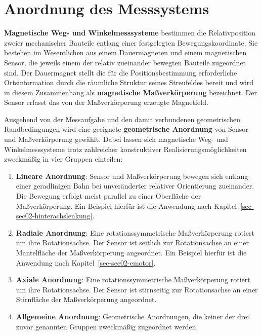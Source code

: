 \documentclass[
  ngerman,
  a4paper,
  twoside]{scrbook}
\providecommand{\tightlist}{%
  \setlength{\itemsep}{0pt}\setlength{\parskip}{0pt}}
\begin{document}
\section{Anordnung des
Messsystems}\label{sec-03-anordnung_des_messsystems}

\textbf{Magnetische Weg- und Winkelmesssysteme} bestimmen die
Relativposition zweier mechanischer Bauteile entlang einer festgelegten
Bewegungskoordinate. Sie bestehen im Wesentlichen aus einem
Dauermagneten und einem magnetischen Sensor, die jeweils einem der
relativ zueinander bewegten Bauteile zugeordnet sind. Der Dauermagnet
stellt die für die Positionsbestimmung erforderliche Ortsinformation
durch die räumliche Struktur seines Streufeldes bereit und wird in
diesem Zusammenhang als \textbf{magnetische Maßverkörperung} bezeichnet.
Der Sensor erfasst das von der Maßverkörperung erzeugte Magnetfeld.

Ausgehend von der Messaufgabe und den damit verbundenen geometrischen
Randbedingungen wird eine geeignete \textbf{geometrische Anordnung} von
Sensor und Maßverkörperung gewählt. Dabei lassen sich magnetische Weg-
und Winkelmesssysteme trotz zahlreicher konstruktiver
Realisierungsmöglichkeiten zweckmäßig in vier Gruppen einteilen:

\begin{enumerate}
\def\labelenumi{\arabic{enumi}.}
\tightlist
\item
  \textbf{Lineare Anordnung}: Sensor und Maßverkörperung bewegen sich
  entlang einer geradlinigen Bahn bei unveränderter relativer
  Orientierung zueinander. Die Bewegung erfolgt meist parallel zu einer
  Oberfläche der Maßverkörperung. Ein Beispiel hierfür ist die Anwendung
  nach Kapitel~\ref{sec-sec02-hinterachslenkung}.
\item
  \textbf{Radiale Anordnung}: Eine rotationssymmetrische Maßverkörperung
  rotiert um ihre Rotationsachse. Der Sensor ist seitlich zur
  Rotationsachse an einer Mantelfläche der Maßverkörperung angeordnet.
  Ein Beispiel hierfür ist die Anwendung nach
  Kapitel~\ref{sec-sec02-emotor}.
\item
  \textbf{Axiale Anordnung}: Eine rotationssymmetrische Maßverkörperung
  rotiert um ihre Rotationsachse. Der Sensor ist stirnseitig zur
  Rotationsachse an einer Stirnfläche der Maßverkörperung angeordnet.
\item
  \textbf{Allgemeine Anordnung}: Geometrische Anordnungen, die keiner
  der drei zuvor genannten Gruppen zweckmäßig zugeordnet werden.
\end{enumerate}
\end{document}
